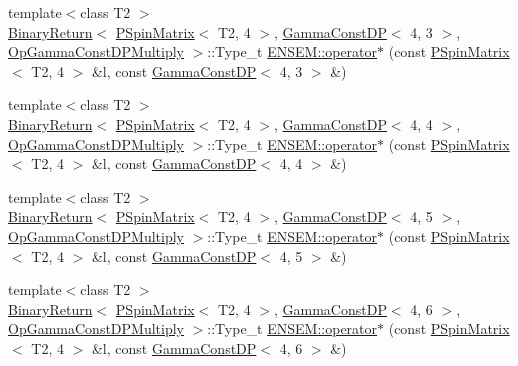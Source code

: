 \begin{DoxyCompactItemize}
\item 
{\footnotesize template$<$class T2 $>$ }\\\mbox{\hyperlink{structENSEM_1_1BinaryReturn}{Binary\+Return}}$<$ \mbox{\hyperlink{classENSEM_1_1PSpinMatrix}{P\+Spin\+Matrix}}$<$ T2, 4 $>$, \mbox{\hyperlink{classENSEM_1_1GammaConstDP}{Gamma\+Const\+DP}}$<$ 4, 3 $>$, \mbox{\hyperlink{structENSEM_1_1OpGammaConstDPMultiply}{Op\+Gamma\+Const\+D\+P\+Multiply}} $>$\+::Type\+\_\+t \mbox{\hyperlink{group__primspinmatrix_ga7049c9a95590816eb50f8755c19aac7e}{E\+N\+S\+E\+M\+::operator$\ast$}} (const \mbox{\hyperlink{classENSEM_1_1PSpinMatrix}{P\+Spin\+Matrix}}$<$ T2, 4 $>$ \&l, const \mbox{\hyperlink{classENSEM_1_1GammaConstDP}{Gamma\+Const\+DP}}$<$ 4, 3 $>$ \&)
\item 
{\footnotesize template$<$class T2 $>$ }\\\mbox{\hyperlink{structENSEM_1_1BinaryReturn}{Binary\+Return}}$<$ \mbox{\hyperlink{classENSEM_1_1PSpinMatrix}{P\+Spin\+Matrix}}$<$ T2, 4 $>$, \mbox{\hyperlink{classENSEM_1_1GammaConstDP}{Gamma\+Const\+DP}}$<$ 4, 4 $>$, \mbox{\hyperlink{structENSEM_1_1OpGammaConstDPMultiply}{Op\+Gamma\+Const\+D\+P\+Multiply}} $>$\+::Type\+\_\+t \mbox{\hyperlink{group__primspinmatrix_gabdda28125d8262f0d1b4f071aaa969eb}{E\+N\+S\+E\+M\+::operator$\ast$}} (const \mbox{\hyperlink{classENSEM_1_1PSpinMatrix}{P\+Spin\+Matrix}}$<$ T2, 4 $>$ \&l, const \mbox{\hyperlink{classENSEM_1_1GammaConstDP}{Gamma\+Const\+DP}}$<$ 4, 4 $>$ \&)
\item 
{\footnotesize template$<$class T2 $>$ }\\\mbox{\hyperlink{structENSEM_1_1BinaryReturn}{Binary\+Return}}$<$ \mbox{\hyperlink{classENSEM_1_1PSpinMatrix}{P\+Spin\+Matrix}}$<$ T2, 4 $>$, \mbox{\hyperlink{classENSEM_1_1GammaConstDP}{Gamma\+Const\+DP}}$<$ 4, 5 $>$, \mbox{\hyperlink{structENSEM_1_1OpGammaConstDPMultiply}{Op\+Gamma\+Const\+D\+P\+Multiply}} $>$\+::Type\+\_\+t \mbox{\hyperlink{group__primspinmatrix_gaf7e4830f4ad99e0601dccbd49cb97662}{E\+N\+S\+E\+M\+::operator$\ast$}} (const \mbox{\hyperlink{classENSEM_1_1PSpinMatrix}{P\+Spin\+Matrix}}$<$ T2, 4 $>$ \&l, const \mbox{\hyperlink{classENSEM_1_1GammaConstDP}{Gamma\+Const\+DP}}$<$ 4, 5 $>$ \&)
\item 
{\footnotesize template$<$class T2 $>$ }\\\mbox{\hyperlink{structENSEM_1_1BinaryReturn}{Binary\+Return}}$<$ \mbox{\hyperlink{classENSEM_1_1PSpinMatrix}{P\+Spin\+Matrix}}$<$ T2, 4 $>$, \mbox{\hyperlink{classENSEM_1_1GammaConstDP}{Gamma\+Const\+DP}}$<$ 4, 6 $>$, \mbox{\hyperlink{structENSEM_1_1OpGammaConstDPMultiply}{Op\+Gamma\+Const\+D\+P\+Multiply}} $>$\+::Type\+\_\+t \mbox{\hyperlink{group__primspinmatrix_gac2a770f56cbf8ef3fd61c80d05ee306e}{E\+N\+S\+E\+M\+::operator$\ast$}} (const \mbox{\hyperlink{classENSEM_1_1PSpinMatrix}{P\+Spin\+Matrix}}$<$ T2, 4 $>$ \&l, const \mbox{\hyperlink{classENSEM_1_1GammaConstDP}{Gamma\+Const\+DP}}$<$ 4, 6 $>$ \&)

\end{DoxyCompactItemize}
